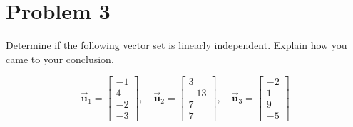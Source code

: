 \documentclass[letter,11pt]{article}
\begin{document}
\section{Problem 3}
Determine if the following vector set is linearly independent. Explain how you came to your conclusion.

$$ \vec{\mathbf{u}}_{1}=\begin{bmatrix} -1 \\ 4 \\ -2 \\ -3 \end{bmatrix}, \quad \vec{\mathbf{u}}_{2}=\begin{bmatrix} 3 \\ -13 \\ 7 \\ 7 \end{bmatrix}, \quad \vec{\mathbf{u}}_{3}=\begin{bmatrix} -2 \\ 1 \\ 9 \\ -5 \end{bmatrix} $$
\end{document}
